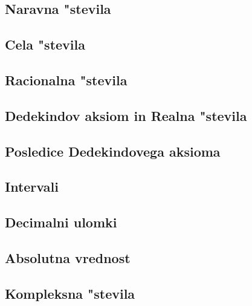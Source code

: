 \subsection{Naravna "stevila}


\subsection{Cela "stevila}


\subsection{Racionalna "stevila}


\subsection{Dedekindov aksiom in Realna "stevila}


\subsection{Posledice Dedekindovega aksioma}


\subsection{Intervali}


\subsection{Decimalni ulomki}


\subsection{Absolutna vrednost}


\subsection{Kompleksna "stevila}

